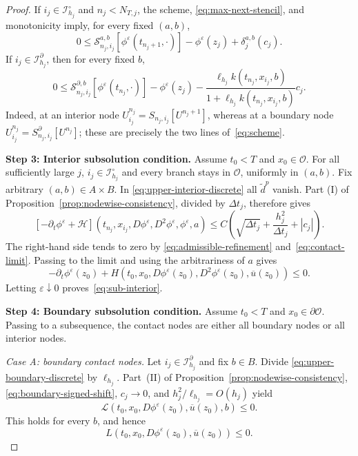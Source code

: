 \documentclass[11pt]{article}
\theoremstyle{definition}
\theoremstyle{remark}
\newcommand{\cO}{\mathcal{O}}
\newcommand{\cS}{\mathcal{S}}
\newcommand{\dt}{\Delta t}
\begin{document}
\begin{proof}
		If $i_j\in\mathcal I_{h_j}^\circ$ and $n_j<N_{T,j}$, the scheme,
		\eqref{eq:max-next-stencil}, and monotonicity imply, for every fixed
		$(a,b)$,
		\begin{equation}
			0\le
			\cS_{n_j,i_j}^{a,b}[\phi^\varepsilon(t_{n_j+1},\cdot)]
			-\phi^\varepsilon(z_j)+\delta_j^{a,b}(c_j).
			\label{eq:upper-interior-discrete}
		\end{equation}
		If $i_j\in\mathcal I_{h_j}^\partial$, then for every fixed $b$,
		\begin{equation}
			0\le
			\cS_{n_j,i_j}^{\partial,b}[\phi^\varepsilon(t_{n_j},\cdot)]
			-\phi^\varepsilon(z_j)
			-\frac{\ell_{h_j}k(t_{n_j},x_{i_j},b)}
			{1+\ell_{h_j}k(t_{n_j},x_{i_j},b)}c_j.
			\label{eq:upper-boundary-discrete}
		\end{equation}
		Indeed, at an interior node
		$U_{i_j}^{n_j}=S_{n_j,i_j}[U^{n_j+1}]$, whereas at a boundary node
		$U_{i_j}^{n_j}=S_{n_j,i_j}^{\partial}[U^{n_j}]$; these are precisely the
		two lines of~\eqref{eq:scheme}.
		
		\medskip
		\noindent\textbf{Step 3: Interior subsolution condition.}
		Assume $t_0<T$ and $x_0\in\cO$.  For all sufficiently large $j$,
		$i_j\in\mathcal I_{h_j}^\circ$ and every branch stays in $\cO$, uniformly
		in $(a,b)$.  Fix arbitrary $(a,b)\in A\times B$.  In
		\eqref{eq:upper-interior-discrete} all $\widetilde d^p$ vanish.  Part
		\textup{(I)} of Proposition~\ref{prop:nodewise-consistency}, divided by
		$\dt_j$, therefore gives
		\[
		[-\partial_t\phi^\varepsilon+\mathcal H]
		(t_{n_j},x_{i_j},D\phi^\varepsilon,D^2\phi^\varepsilon,
		\phi^\varepsilon,a)
		\le C\left(\sqrt{\dt_j}+\frac{h_j^2}{\dt_j}+|c_j|\right).
		\]
		The right-hand side tends to zero by
		\eqref{eq:admissible-refinement} and~\eqref{eq:contact-limit}.  Passing to
		the limit and using the arbitrariness of $a$ gives
		\[
		-\partial_t\phi^\varepsilon(z_0)
		+H(t_0,x_0,D\phi^\varepsilon(z_0),D^2\phi^\varepsilon(z_0),
		\overline u(z_0))\le0.
		\]
		Letting $\varepsilon\downarrow0$ proves~\eqref{eq:sub-interior}.
		
		\medskip
		\noindent\textbf{Step 4: Boundary subsolution condition.}
		Assume $t_0<T$ and $x_0\in\partial\cO$.  Passing to a subsequence, the
		contact nodes are either all boundary nodes or all interior nodes.
		
		\smallskip
		\noindent\textit{Case A: boundary contact nodes.}
		Let $i_j\in\mathcal I_{h_j}^\partial$ and fix $b\in B$.  Divide
		\eqref{eq:upper-boundary-discrete} by $\ell_{h_j}$.  Part~\textup{(II)} of
		Proposition~\ref{prop:nodewise-consistency},
		\eqref{eq:boundary-signed-shift}, $c_j\to0$, and
		$h_j^2/\ell_{h_j}=O(h_j)$ yield
		\[
		\mathcal L(t_0,x_0,D\phi^\varepsilon(z_0),
		\overline u(z_0),b)\le0.
		\]
		This holds for every $b$, and hence
		\begin{equation}
			L(t_0,x_0,D\phi^\varepsilon(z_0),\overline u(z_0))\le0.
			\label{eq:boundary-node-sub}
		\end{equation}
		

\end{proof}
\end{document}
